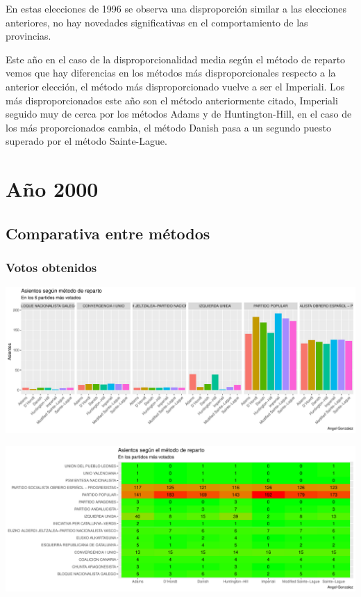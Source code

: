 \documentclass[12pt,a4paper,]{book}
\numberwithin{dummy}{section}
\theoremstyle{ocrenumbox}
\theoremstyle{blacknumex}
\theoremstyle{blacknumbox}
\theoremstyle{ocrenum}
\theoremstyle{ocrenum}
\begin{document}
En estas elecciones de 1996 se observa una disproporción similar a las
elecciones anteriores, no hay novedades significativas en el
comportamiento de las provincias.

Este año en el caso de la disproporcionalidad media según el método de
reparto vemos que hay diferencias en los métodos más disproporcionales
respecto a la anterior elección, el método más disproporcionado vuelve a
ser el Imperiali. Los más disproporcionados este año son el método
anteriormente citado, Imperiali seguido muy de cerca por los métodos
Adams y de Huntington-Hill, en el caso de los más proporcionados cambia,
el método Danish pasa a un segundo puesto superado por el método
Sainte-Lague.

\hypertarget{auxf1o-2000}{%
\section{Año 2000}\label{auxf1o-2000}}

\hypertarget{comparativa-entre-muxe9todos-7}{%
\subsection{Comparativa entre
métodos}\label{comparativa-entre-muxe9todos-7}}

\hypertarget{votos-obtenidos-7}{%
\subsubsection{Votos obtenidos}\label{votos-obtenidos-7}}

\begin{center}\includegraphics[width=0.95\linewidth]{figurasR/unnamed-chunk-122-1} \end{center}

\begin{center}\includegraphics[width=0.95\linewidth]{figurasR/unnamed-chunk-122-2} \end{center}
\end{document}
